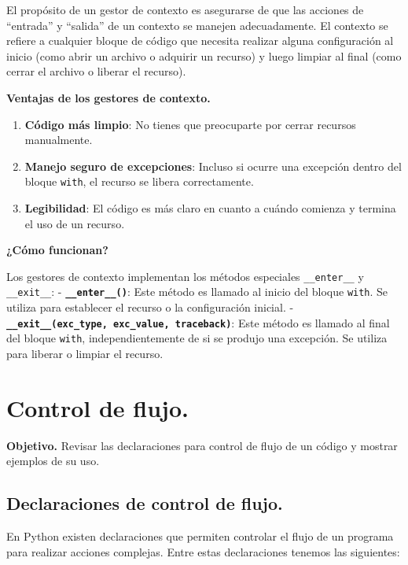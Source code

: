 \documentclass[
  spanish,
  letterpaper,
]{scrbook}
\providecommand{\tightlist}{%
  \setlength{\itemsep}{0pt}\setlength{\parskip}{0pt}}
\theoremstyle{definition}
\theoremstyle{remark}
\begin{document}
El propósito de un gestor de contexto es asegurarse de que las acciones
de ``entrada'' y ``salida'' de un contexto se manejen adecuadamente. El
contexto se refiere a cualquier bloque de código que necesita realizar
alguna configuración al inicio (como abrir un archivo o adquirir un
recurso) y luego limpiar al final (como cerrar el archivo o liberar el
recurso).

\textbf{Ventajas de los gestores de contexto.}

\begin{enumerate}
\def\labelenumi{\arabic{enumi}.}
\tightlist
\item
  \textbf{Código más limpio}: No tienes que preocuparte por cerrar
  recursos manualmente.
\item
  \textbf{Manejo seguro de excepciones}: Incluso si ocurre una excepción
  dentro del bloque \texttt{with}, el recurso se libera correctamente.
\item
  \textbf{Legibilidad}: El código es más claro en cuanto a cuándo
  comienza y termina el uso de un recurso.
\end{enumerate}

\textbf{¿Cómo funcionan?}

Los gestores de contexto implementan los métodos especiales
\texttt{\_\_enter\_\_} y \texttt{\_\_exit\_\_}: -
\textbf{\texttt{\_\_enter\_\_()}}: Este método es llamado al inicio del
bloque \texttt{with}. Se utiliza para establecer el recurso o la
configuración inicial. -
\textbf{\texttt{\_\_exit\_\_(exc\_type,\ exc\_value,\ traceback)}}: Este
método es llamado al final del bloque \texttt{with}, independientemente
de si se produjo una excepción. Se utiliza para liberar o limpiar el
recurso.

\chapter{Control de flujo.}\label{sec-h-control_de_flujo}

\textbf{Objetivo.} Revisar las declaraciones para control de flujo de un
código y mostrar ejemplos de su uso.

\section{Declaraciones de control de
flujo.}\label{declaraciones-de-control-de-flujo.}

En Python existen declaraciones que permiten controlar el flujo de un
programa para realizar acciones complejas. Entre estas declaraciones
tenemos las siguientes:
\end{document}
